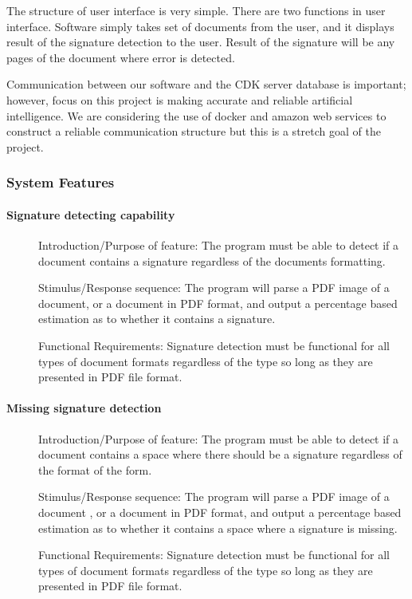 \documentclass[article, onecolumn, draftclsnofoot,10pt, compsoc]{IEEEtran}
\begin{document}
The structure of user interface is very simple. There are two functions in user interface. Software simply takes set of documents from the user, and it displays result of the signature detection to the user. Result of the signature will be any pages of the document where error is detected.

Communication between our software and the CDK server database is important; however, focus on this project is making accurate and reliable artificial intelligence. We are considering the use of docker and amazon web services to construct a reliable communication structure but this is a stretch goal of the project.

\subsubsection{System Features}
\paragraph{Signature detecting capability}\vspace{.5cm}
\begin{description}
\item [] Introduction/Purpose of feature: The program must be able to detect if a document contains a signature regardless of the documents formatting.
\item [] Stimulus/Response sequence: The program will parse a PDF image of a document, or a document in PDF format, and output a percentage based estimation as to whether it contains a signature.
\item [] Functional Requirements: Signature detection must be functional for all types of document formats regardless of the type so long as they are presented in PDF file format. 
\end{description}



\paragraph{Missing signature detection}\vspace{.5cm}
\begin{description}
\item [] Introduction/Purpose of feature: The program must be able to detect if a document contains a space where there should be a signature regardless of the format of the form.
\item [] Stimulus/Response sequence: The program will parse a PDF image of a document , or a document in PDF format, and output a percentage based estimation as to whether it contains a space where a signature is missing.
\item [] Functional Requirements: Signature detection must be functional for all types of document formats regardless of the type so long as they are presented in PDF file format. 
\end{description}
\end{document}

